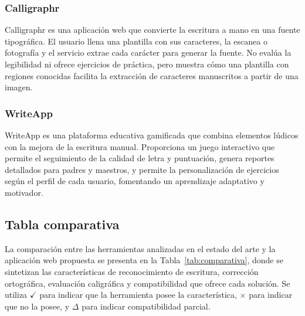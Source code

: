 \subsubsection{Calligraphr}
Calligraphr \cite{calligraphr2024} es una aplicación web que convierte la escritura a mano en una fuente tipográfica. El usuario llena una plantilla con sus caracteres, la escanea o fotografía y el servicio extrae cada carácter para generar la fuente. No evalúa la legibilidad ni ofrece ejercicios de práctica, pero muestra cómo una plantilla con regiones conocidas facilita la extracción de caracteres manuscritos a partir de una imagen.

\subsubsection{WriteApp}
WriteApp \cite{writeapp2024} es una plataforma educativa gamificada que combina elementos lúdicos con la mejora de la escritura manual. Proporciona un juego interactivo que permite el seguimiento de la calidad de letra y puntuación, genera reportes detallados para padres y maestros, y permite la personalización de ejercicios según el perfil de cada usuario, fomentando un aprendizaje adaptativo y motivador.

\subsection{Tabla comparativa}

La comparación entre las herramientas analizadas en el estado del arte y la aplicación web propuesta se presenta en la Tabla~\ref{tab:comparativa}, donde se sintetizan las características de reconocimiento de escritura, corrección ortográfica, evaluación caligráfica y compatibilidad que ofrece cada solución. Se utiliza $\checkmark$ para indicar que la herramienta posee la característica, $\times$ para indicar que no la posee, y $\Delta$ para indicar compatibilidad parcial.

